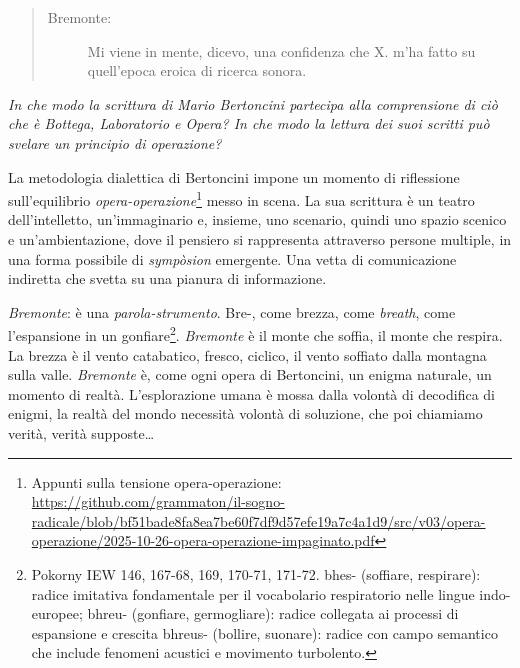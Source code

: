 \begin{quote}
  \begin{sf}
    \small
    \begin{description}
      \item[Bremonte:] Mi viene in mente, dicevo, una confidenza che X. m’ha
      fatto su quell’epoca eroica di ricerca sonora. \cite{bertoncini07}
    \end{description}
  \end{sf}
\end{quote}

\emph{In che modo la scrittura di Mario Bertoncini partecipa alla comprensione
di ciò che è Bottega, Laboratorio e Opera? In che modo la lettura dei suoi
scritti può svelare un principio di operazione?}

La metodologia dialettica di Bertoncini impone un momento di riflessione
sull'equilibrio \emph{opera-operazione}\footnote{
  Appunti sulla tensione opera-operazione:\\
  \url{https://github.com/grammaton/il-sogno-radicale/blob/bf51bade8fa8ea7be60f7df9d57efe19a7c4a1d9/src/v03/opera-operazione/2025-10-26-opera-operazione-impaginato.pdf}
} messo in scena. La sua scrittura è un
teatro dell'intelletto, un'immaginario e, insieme, uno scenario, quindi uno
spazio scenico e un'ambientazione, dove il pensiero si rappresenta attraverso
persone multiple, in una forma possibile di \emph{sympòsion} emergente. Una
vetta di comunicazione indiretta \cite{ronchi2001} che svetta su una pianura di
informazione.

\emph{Bremonte}: è una \emph{parola-strumento}. {\phonfont *Bre-}, come brezza,
come \emph{breath}, come l'espansione in un gonfiare\footnote{Pokorny IEW 146,
  167-68, 169, 170-71, 171-72. {\phonfont *bhes-} (soffiare, respirare): radice
  imitativa fondamentale per il vocabolario respiratorio nelle lingue indo-europee;
  {\phonfont *bhreu-} (gonfiare, germogliare): radice collegata ai processi di
  espansione e crescita {\phonfont *bhreus-} (bollire, suonare): radice con campo
  semantico che include fenomeni acustici e movimento turbolento.}.
\emph{Bremonte} è il monte che soffia, il monte che respira. La brezza è il vento
catabatico, fresco, ciclico, il vento soffiato dalla montagna sulla valle.
\emph{Bremonte} è, come ogni opera di Bertoncini, un enigma naturale, un momento
di realtà. L'esplorazione umana è mossa dalla volontà di decodifica di enigmi,
la realtà del mondo necessità volontà di soluzione, che poi chiamiamo verità,
verità supposte\ldots~%

